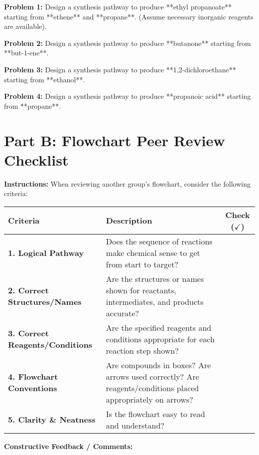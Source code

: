 \documentclass[11pt, a4paper]{article}
\begin{document}
\textbf{Problem 1:} Design a synthesis pathway to produce **ethyl propanoate** starting from **ethene** and **propane**. (Assume necessary inorganic reagents are available).

\vspace{0.5cm} \hrulefill \vspace{0.5cm}

\textbf{Problem 2:} Design a synthesis pathway to produce **butanone** starting from **but-1-ene**.

\vspace{0.5cm} \hrulefill \vspace{0.5cm}

\textbf{Problem 3:} Design a synthesis pathway to produce **1,2-dichloroethane** starting from **ethanol**.

\vspace{0.5cm} \hrulefill \vspace{0.5cm}

\textbf{Problem 4:} Design a synthesis pathway to produce **propanoic acid** starting from **propane**.

\section*{Part B: Flowchart Peer Review Checklist}

\textbf{Instructions:} When reviewing another group's flowchart, consider the following criteria:

\begin{tabular}{|l|p{8cm}|c|}
\hline
\textbf{Criteria} & \textbf{Description} & \textbf{Check ($\checkmark$)} \\ \hline
\textbf{1. Logical Pathway} & Does the sequence of reactions make chemical sense to get from start to target? & \\ \hline
\textbf{2. Correct Structures/Names} & Are the structures or names shown for reactants, intermediates, and products accurate? & \\ \hline
\textbf{3. Correct Reagents/Conditions} & Are the specified reagents and conditions appropriate for each reaction step shown? & \\ \hline
\textbf{4. Flowchart Conventions} & Are compounds in boxes? Are arrows used correctly? Are reagents/conditions placed appropriately on arrows? & \\ \hline
\textbf{5. Clarity \& Neatness} & Is the flowchart easy to read and understand? & \\ \hline
\end{tabular}

\vspace{1cm}
\textbf{Constructive Feedback / Comments:}
\vspace{2cm}
\end{document}
